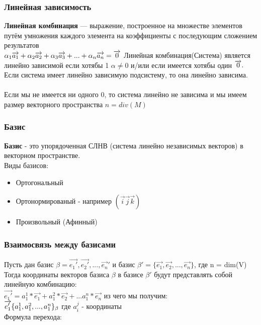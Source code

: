 \documentclass{article}
\begin{document}
\subsubsection{Линейная зависимость}
\textbf{Линейная комбинация} — выражение, построенное на множестве элементов путём умножения каждого элемента на коэффициенты с последующим сложением результатов\\
$\alpha_1\overrightarrow{a_1}+\alpha_2\overrightarrow{a_2}+\alpha_3\overrightarrow{a_3}+...+\alpha_n\overrightarrow{a_n}=\overrightarrow{0}\\$
Линейная комбинация(Система) является линейно зависимой если хотябы 1 $\alpha\neq0$ и/или если имеется хотябы один $\overrightarrow{0}.\\$
Если система имеет линейно зависимую подсистему, то она линейно зависима.\\\\
Если мы не имеется ни одного 0, то система линейно не зависима и мы имеем размер векторного пространства $n = div(M)$
\subsubsection{Базис}
\textbf{Базис} - это упорядоченная СЛНВ (система линейно независимых векторов) в векторном пространстве.\\
Виды базисов:
\begin{itemize}
    \item Ортогональный
    \item Ортонормированый - например $(\overrightarrow{i}\overrightarrow{j}\overrightarrow{k})$
    \item Произвольный (Афинный)
\end{itemize}
\subsubsection{Взаимосвязь между базисами}
Пусть дан базис $\beta={\overrightarrow{e_1'},\overrightarrow{e_2'},...,\overrightarrow{e_n}'}$ и базис $\beta'=\{\overrightarrow{e_1},\overrightarrow{e_2},...,\overrightarrow{e_n}\}$, где n = dim(V)\\
Тогда координаты векторов базиса $\beta$ в базисе $\beta'$ будут представлять собой линейную комбинацию: \\
$\overrightarrow{e_1'}=a_1^1*\overrightarrow{e_1}+a_1^2*\overrightarrow{e_2}+...a_1^n*\overrightarrow{e_n}$ из чего мы получим:\\
$\overrightarrow{e_1'}\{a_1^1,a_1^2,...,a_1^n\}_\beta\\$
где $a^j_i$ - координаты\\
Формула перехода:
\end{document}
